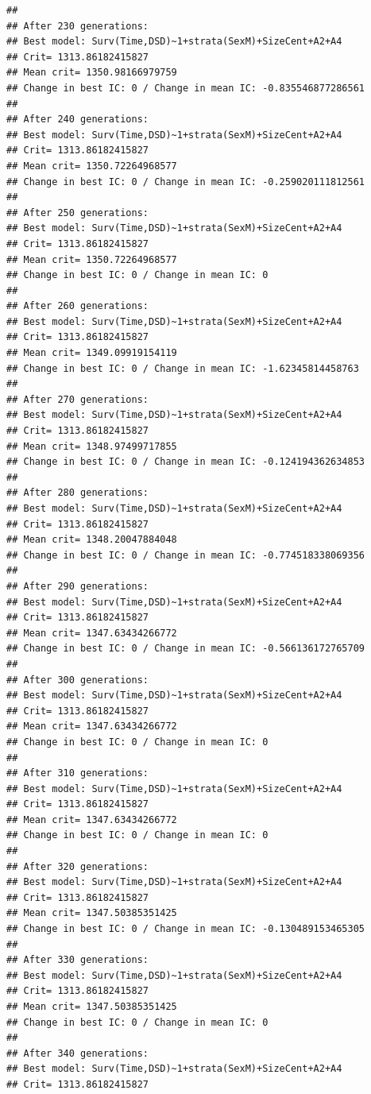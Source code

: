 \documentclass{article}\usepackage[]{graphicx}\usepackage[]{color}
\makeatletter
\newenvironment{kframe}{%
 \def\at@end@of@kframe{}%
 \ifinner\ifhmode%
  \def\at@end@of@kframe{\end{minipage}}%
  \begin{minipage}{\columnwidth}%
 \fi\fi%
 \def\FrameCommand##1{\hskip\@totalleftmargin \hskip-\fboxsep
 \colorbox{shadecolor}{##1}\hskip-\fboxsep
     \hskip-\linewidth \hskip-\@totalleftmargin \hskip\columnwidth}%
 \MakeFramed {\advance\hsize-\width
   \@totalleftmargin\z@ \linewidth\hsize
   \@setminipage}}%
 {\par\unskip\endMakeFramed%
 \at@end@of@kframe}
\newenvironment{knitrout}{}{} %
\makeatother
\begin{document}
\begin{knitrout}
\begin{kframe}
{\ttfamily\noindent\color{warningcolor}{\#\# Warning in fitter(X, Y, strats, offset, init, control, weights = weights, : Loglik converged before variable\ \ 3 ; beta may be infinite.}}\begin{verbatim}
## 
## After 230 generations:
## Best model: Surv(Time,DSD)~1+strata(SexM)+SizeCent+A2+A4
## Crit= 1313.86182415827
## Mean crit= 1350.98166979759
## Change in best IC: 0 / Change in mean IC: -0.835546877286561
## 
## After 240 generations:
## Best model: Surv(Time,DSD)~1+strata(SexM)+SizeCent+A2+A4
## Crit= 1313.86182415827
## Mean crit= 1350.72264968577
## Change in best IC: 0 / Change in mean IC: -0.259020111812561
## 
## After 250 generations:
## Best model: Surv(Time,DSD)~1+strata(SexM)+SizeCent+A2+A4
## Crit= 1313.86182415827
## Mean crit= 1350.72264968577
## Change in best IC: 0 / Change in mean IC: 0
## 
## After 260 generations:
## Best model: Surv(Time,DSD)~1+strata(SexM)+SizeCent+A2+A4
## Crit= 1313.86182415827
## Mean crit= 1349.09919154119
## Change in best IC: 0 / Change in mean IC: -1.62345814458763
## 
## After 270 generations:
## Best model: Surv(Time,DSD)~1+strata(SexM)+SizeCent+A2+A4
## Crit= 1313.86182415827
## Mean crit= 1348.97499717855
## Change in best IC: 0 / Change in mean IC: -0.124194362634853
## 
## After 280 generations:
## Best model: Surv(Time,DSD)~1+strata(SexM)+SizeCent+A2+A4
## Crit= 1313.86182415827
## Mean crit= 1348.20047884048
## Change in best IC: 0 / Change in mean IC: -0.774518338069356
## 
## After 290 generations:
## Best model: Surv(Time,DSD)~1+strata(SexM)+SizeCent+A2+A4
## Crit= 1313.86182415827
## Mean crit= 1347.63434266772
## Change in best IC: 0 / Change in mean IC: -0.566136172765709
## 
## After 300 generations:
## Best model: Surv(Time,DSD)~1+strata(SexM)+SizeCent+A2+A4
## Crit= 1313.86182415827
## Mean crit= 1347.63434266772
## Change in best IC: 0 / Change in mean IC: 0
## 
## After 310 generations:
## Best model: Surv(Time,DSD)~1+strata(SexM)+SizeCent+A2+A4
## Crit= 1313.86182415827
## Mean crit= 1347.63434266772
## Change in best IC: 0 / Change in mean IC: 0
## 
## After 320 generations:
## Best model: Surv(Time,DSD)~1+strata(SexM)+SizeCent+A2+A4
## Crit= 1313.86182415827
## Mean crit= 1347.50385351425
## Change in best IC: 0 / Change in mean IC: -0.130489153465305
## 
## After 330 generations:
## Best model: Surv(Time,DSD)~1+strata(SexM)+SizeCent+A2+A4
## Crit= 1313.86182415827
## Mean crit= 1347.50385351425
## Change in best IC: 0 / Change in mean IC: 0
## 
## After 340 generations:
## Best model: Surv(Time,DSD)~1+strata(SexM)+SizeCent+A2+A4
## Crit= 1313.86182415827

\end{verbatim}
\end{kframe}
\end{knitrout}
\end{document}
